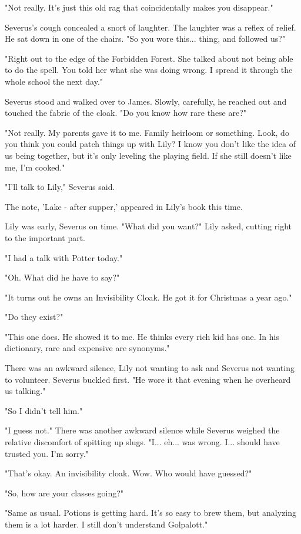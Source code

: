\documentclass[a4paper,11pt]{article}
\begin{document}
"Not really. It's just this old rag that coincidentally makes you disappear."

Severus's cough concealed a snort of laughter. The laughter was a reflex of relief. He sat down in one of the chairs. "So you wore this... thing, and followed us?"

"Right out to the edge of the Forbidden Forest. She talked about not being able to do the spell. You told her what she was doing wrong. I spread it through the whole school the next day."

Severus stood and walked over to James. Slowly, carefully, he reached out and touched the fabric of the cloak. "Do you know how rare these are?"

"Not really. My parents gave it to me. Family heirloom or something. Look, do you think you could patch things up with Lily? I know you don't like the idea of us being together, but it's only leveling the playing field. If she still doesn't like me, I'm cooked."

"I'll talk to Lily," Severus said.

The note, 'Lake - after supper,' appeared in Lily's book this time.

Lily was early, Severus on time. "What did you want?" Lily asked, cutting right to the important part.

"I had a talk with Potter today."

"Oh. What did he have to say?"

"It turns out he owns an Invisibility Cloak. He got it for Christmas a year ago."

"Do they exist?"

"This one does. He showed it to me. He thinks every rich kid has one. In his dictionary, rare and expensive are synonyms."

There was an awkward silence, Lily not wanting to ask and Severus not wanting to volunteer. Severus buckled first. "He wore it that evening when he overheard us talking."

"So I didn't tell him."

"I guess not." There was another awkward silence while Severus weighed the relative discomfort of spitting up slugs. "I... eh... was wrong. I... should have trusted you. I'm sorry."

"That's okay. An invisibility cloak. Wow. Who would have guessed?"

"So, how are your classes going?"

"Same as usual. Potions is getting hard. It's so easy to brew them, but analyzing them is a lot harder. I still don't understand Golpalott."
\end{document}
